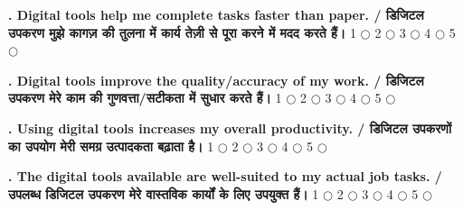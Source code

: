 \documentclass[11pt,a4paper]{article}
\newcounter{qcounter}
\begin{document}
\textbf{. Digital tools help me complete tasks faster than paper. / डिजिटल उपकरण मुझे कागज़ की तुलना में कार्य तेज़ी से पूरा करने में मदद करते हैं।}
\vspace{0.1cm}
\vspace{0.1cm}
1 $\bigcirc$ \hspace{1cm} 2 $\bigcirc$ \hspace{1cm} 3 $\bigcirc$ \hspace{1cm} 4 $\bigcirc$ \hspace{1cm} 5 $\bigcirc$
\vspace{0.4cm}

\textbf{. Digital tools improve the quality/accuracy of my work. / डिजिटल उपकरण मेरे काम की गुणवत्ता/सटीकता में सुधार करते हैं।}
\vspace{0.1cm}
\vspace{0.1cm}
1 $\bigcirc$ \hspace{1cm} 2 $\bigcirc$ \hspace{1cm} 3 $\bigcirc$ \hspace{1cm} 4 $\bigcirc$ \hspace{1cm} 5 $\bigcirc$
\vspace{0.4cm}

\textbf{. Using digital tools increases my overall productivity. / डिजिटल उपकरणों का उपयोग मेरी समग्र उत्पादकता बढ़ाता है।}
\vspace{0.1cm}
\vspace{0.1cm}
1 $\bigcirc$ \hspace{1cm} 2 $\bigcirc$ \hspace{1cm} 3 $\bigcirc$ \hspace{1cm} 4 $\bigcirc$ \hspace{1cm} 5 $\bigcirc$
\vspace{0.4cm}

\textbf{. The digital tools available are well-suited to my actual job tasks. / उपलब्ध डिजिटल उपकरण मेरे वास्तविक कार्यों के लिए उपयुक्त हैं।}
\vspace{0.1cm}
\vspace{0.1cm}
1 $\bigcirc$ \hspace{1cm} 2 $\bigcirc$ \hspace{1cm} 3 $\bigcirc$ \hspace{1cm} 4 $\bigcirc$ \hspace{1cm} 5 $\bigcirc$
\vspace{0.4cm}
\end{document}
